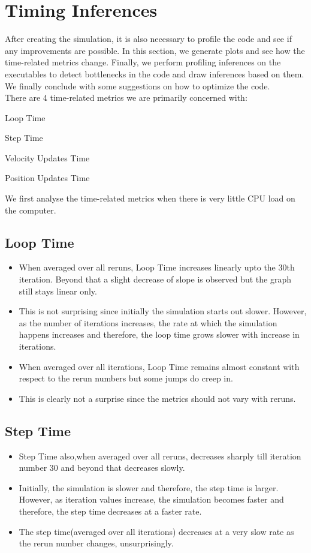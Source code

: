 \documentclass[11pt]{article}
\begin{document}
\section{Timing Inferences}
After creating the simulation, it is also necessary to profile the code and see if any improvements are possible. In this section, we generate plots and see how the time-related metrics change.
Finally, we perform profiling inferences on the executables to detect bottlenecks in the code and draw inferences based on them. We finally conclude with some suggestions on how to optimize the code. \\
There are 4 time-related metrics we are primarily concerned with:

 Loop Time
 
 Step Time
 
 Velocity Updates Time
 
 Position Updates Time


We first analyse the time-related metrics when there is very little CPU load on the computer.



\subsection{Loop Time}



\begin{itemize}
	\item When averaged over all reruns, Loop Time increases linearly upto the 30th iteration. Beyond that a slight decrease of slope is observed but the graph still stays linear only. 
	\item This is not surprising since initially the simulation starts out slower. However, as the number of iterations increases, the rate at which the simulation happens increases and therefore, the loop time grows slower with increase in iterations.
	\item When averaged over all iterations, Loop Time remains almost constant with respect to the rerun numbers but some jumps do creep in.
	\item This is clearly not a surprise since the metrics should not vary with reruns.	
\end{itemize}



\subsection{Step Time}
	\begin{itemize}
		\item Step Time also,when averaged over all reruns, decreases sharply till iteration number 30 and beyond that decreases slowly.
		\item Initially, the simulation is slower and therefore, the step time is larger. However, as iteration values increase, the simulation becomes faster and therefore, the step time decreases at a faster rate.
		\item The step time(averaged over all iterations) decreases at a very slow rate as the rerun number changes, unsurprisingly.
	\end{itemize}
\end{document}
